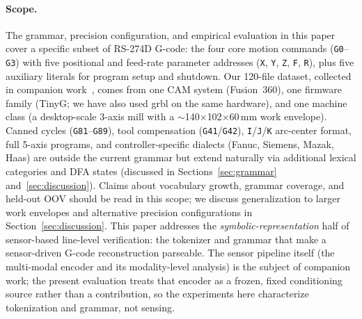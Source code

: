 \documentclass[sensors,article,submit,moreauthors,pdftex]{Definitions/mdpi}
\begin{document}
\paragraph{Scope.}
The grammar, precision configuration, and empirical evaluation in this paper cover a specific subset of RS-274D G-code: the four core motion commands (\texttt{G0}--\texttt{G3}) with five positional and feed-rate parameter addresses (\texttt{X}, \texttt{Y}, \texttt{Z}, \texttt{F}, \texttt{R}), plus five auxiliary literals for program setup and shutdown. Our 120-file dataset, collected in companion work~\cite{encoder_paper}, comes from one CAM system (Fusion~360), one firmware family (TinyG; we have also used grbl on the same hardware), and one machine class (a desktop-scale 3-axis mill with a $\sim$140$\times$102$\times$60\,mm work envelope). Canned cycles (\texttt{G81}--\texttt{G89}), tool compensation (\texttt{G41}/\texttt{G42}), \texttt{I}/\texttt{J}/\texttt{K} arc-center format, full 5-axis programs, and controller-specific dialects (Fanuc, Siemens, Mazak, Haas) are outside the current grammar but extend naturally via additional lexical categories and DFA states (discussed in Sections~\ref{sec:grammar} and~\ref{sec:discussion}). Claims about vocabulary growth, grammar coverage, and held-out OOV should be read in this scope; we discuss generalization to larger work envelopes and alternative precision configurations in Section~\ref{sec:discussion}. This paper addresses the \emph{symbolic-representation} half of sensor-based line-level verification: the tokenizer and grammar that make a sensor-driven G-code reconstruction parseable. The sensor pipeline itself (the multi-modal encoder and its modality-level analysis) is the subject of companion work; the present evaluation treats that encoder as a frozen, fixed conditioning source rather than a contribution, so the experiments here characterize tokenization and grammar, not sensing.
\end{document}
